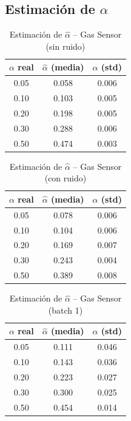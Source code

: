 \documentclass[a4paper,11pt]{article}
\begin{document}
\subsection{Estimación de $\alpha$}

\begin{table}[H]
\centering
\caption{Estimación de $\hat{\alpha}$ -- Gas Sensor (sin ruido)}
\begin{tabular}{ccc}
\toprule
$\alpha$ real & $\hat{\alpha}$ (media) & $\hat{\alpha}$ (std) \\
\midrule
0.05 & 0.058 & 0.006 \\
0.10 & 0.103 & 0.005 \\
0.20 & 0.198 & 0.005 \\
0.30 & 0.288 & 0.006 \\
0.50 & 0.474 & 0.003 \\
\bottomrule
\end{tabular}
\end{table}

\begin{table}[H]
\centering
\caption{Estimación de $\hat{\alpha}$ -- Gas Sensor (con ruido)}
\begin{tabular}{ccc}
\toprule
$\alpha$ real & $\hat{\alpha}$ (media) & $\hat{\alpha}$ (std) \\
\midrule
0.05 & 0.078 & 0.006 \\
0.10 & 0.104 & 0.006 \\
0.20 & 0.169 & 0.007 \\
0.30 & 0.243 & 0.004 \\
0.50 & 0.389 & 0.008 \\
\bottomrule
\end{tabular}
\end{table}

\begin{table}[H]
\centering
\caption{Estimación de $\hat{\alpha}$ -- Gas Sensor (batch 1)}
\begin{tabular}{ccc}
\toprule
$\alpha$ real & $\hat{\alpha}$ (media) & $\hat{\alpha}$ (std) \\
\midrule
0.05 & 0.111 & 0.046 \\
0.10 & 0.143 & 0.036 \\
0.20 & 0.223 & 0.027 \\
0.30 & 0.300 & 0.025 \\
0.50 & 0.454 & 0.014 \\
\bottomrule
\end{tabular}
\end{table}
\end{document}
